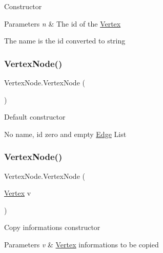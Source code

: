 Constructor 


\begin{DoxyParams}{Parameters}
{\em n} & The id of the \hyperlink{structVertex}{Vertex}\\
\hline
\end{DoxyParams}


The name is the id converted to string\mbox{\label{classVertexNode_a4b0f51a95aeda0ecdb5da3553875c3af}} 
\subsubsection{\texorpdfstring{Vertex\+Node()}{VertexNode()}\hspace{0.1cm}{\footnotesize\ttfamily [3/5]}}
{\footnotesize\ttfamily Vertex\+Node.\+Vertex\+Node (\begin{DoxyParamCaption}{ }\end{DoxyParamCaption})\hspace{0.3cm}{\ttfamily [inline]}}



Default constructor 

No name, id zero and empty \hyperlink{classEdge}{Edge} List\mbox{\label{classVertexNode_ab9d2196f633d0bacc8c59f6e8b141784}} 
\subsubsection{\texorpdfstring{Vertex\+Node()}{VertexNode()}\hspace{0.1cm}{\footnotesize\ttfamily [4/5]}}
{\footnotesize\ttfamily Vertex\+Node.\+Vertex\+Node (\begin{DoxyParamCaption}\item[{\hyperlink{structVertex}{Vertex}}]{v }\end{DoxyParamCaption})\hspace{0.3cm}{\ttfamily [inline]}}



Copy informations constructor 


\begin{DoxyParams}{Parameters}
{\em v} & \hyperlink{structVertex}{Vertex} informations to be copied\\
\hline
\end{DoxyParams}
\mbox{\label{classVertexNode_a6da3df0f6dcf1e9a52a4f5dbc20709a1}} 

